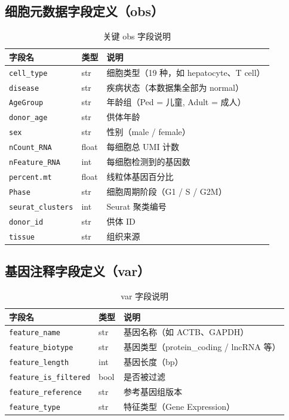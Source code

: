 \documentclass[12pt,a4paper]{ctexart}
\begin{document}
\subsection{细胞元数据字段定义（obs）}

\begin{table}[H]
\centering
\caption{关键 obs 字段说明}
\begin{tabular}{l|l|p{5cm}}
\toprule
\textbf{字段名} & \textbf{类型} & \textbf{说明} \\
\midrule
\texttt{cell\_type}           & str  & 细胞类型（19 种，如 hepatocyte、T cell） \\
\texttt{disease}              & str  & 疾病状态（本数据集全部为 normal） \\
\texttt{AgeGroup}             & str  & 年龄组（Ped = 儿童, Adult = 成人） \\
\texttt{donor\_age}           & str  & 供体年龄 \\
\texttt{sex}                  & str  & 性别（male / female） \\
\texttt{nCount\_RNA}          & float & 每细胞总 UMI 计数 \\
\texttt{nFeature\_RNA}        & int  & 每细胞检测到的基因数 \\
\texttt{percent.mt}           & float & 线粒体基因百分比 \\
\texttt{Phase}                & str  & 细胞周期阶段（G1 / S / G2M） \\
\texttt{seurat\_clusters}     & int  & Seurat 聚类编号 \\
\texttt{donor\_id}            & str  & 供体 ID \\
\texttt{tissue}               & str  & 组织来源 \\
\bottomrule
\end{tabular}
\end{table}

\subsection{基因注释字段定义（var）}

\begin{table}[H]
\centering
\caption{var 字段说明}
\begin{tabular}{l|l|p{5cm}}
\toprule
\textbf{字段名} & \textbf{类型} & \textbf{说明} \\
\midrule
\texttt{feature\_name}        & str  & 基因名称（如 ACTB、GAPDH） \\
\texttt{feature\_biotype}     & str  & 基因类型（protein\_coding / lncRNA 等） \\
\texttt{feature\_length}      & int  & 基因长度（bp） \\
\texttt{feature\_is\_filtered}& bool & 是否被过滤 \\
\texttt{feature\_reference}   & str  & 参考基因组版本 \\
\texttt{feature\_type}        & str  & 特征类型（Gene Expression） \\
\bottomrule
\end{tabular}
\end{table}
\end{document}
